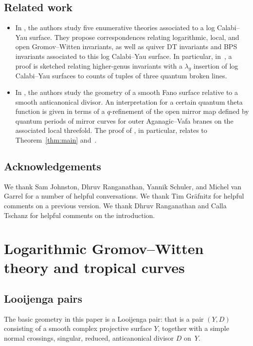 \documentclass[11pt]{amsart}
\numberwithin{equation}{section}
\theoremstyle{plain}
\theoremstyle{remark}
\theoremstyle{definition}
\begin{document}
\subsection{Related work}\begin{itemize}
    \item In \cite{bousseau2024looijenga}, the authors study five enumerative theories associated to a log Calabi--Yau surface. They propose correspondences relating logarithmic, local, and open Gromov--Witten invariants, as well as quiver DT invariants and BPS invariants associated to this log Calabi--Yau surface. In particular, in~\cite[Proposition 4.2]{bousseau2024looijenga}, a proof is sketched relating higher-genus invariants with a $\lambda_g$ insertion of log Calabi--Yau surfaces to counts of tuples of three quantum broken lines. 
    \item In \cite{grafnitz2025enumerative}, the authors study the geometry of a smooth Fano surface relative to a smooth anticanonical divisor. An interpretation for a certain quantum theta function is given in terms of a $q$-refinement of the open mirror map  defined by quantum periods of mirror curves for outer Aganagic--Vafa branes on the associated local threefold. The proof of \cite[Proposition 3.12]{grafnitz2025enumerative}, in particular, relates to Theorem~\ref{thm:main} and~\cite[Theorem A]{kennedyhunt2023tropical}.
\end{itemize}

\subsection{Acknowledgements}
We thank Sam Johnston, Dhruv Ranganathan, Yannik Schuler, and Michel
van Garrel for a number of helpful conversations. We thank Tim
Gr\"afnitz for helpful comments on a previous version. We thank Dhruv
Ranganathan and Calla Tschanz for helpful comments on the
introduction.


\section{Logarithmic Gromov--Witten theory and tropical curves}\label{Section : Statement + logGW}

\subsection{Looijenga pairs}\label{Section : Looijenga pairs}
The basic geometry in this paper is a Looijenga pair: that is a pair $(Y,D)$ consisting of a smooth complex projective surface $Y$, together with a simple normal crossings, singular, reduced, anticanonical divisor $D$ on~$Y$. 
\end{document}
